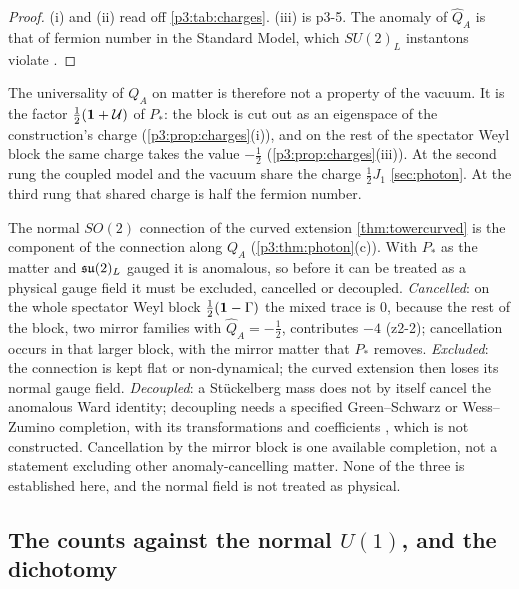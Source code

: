 \begin{proof}
(i) and (ii) read off \cref{p3:tab:charges}. (iii) is p3-5. The anomaly of $\hat Q_A$ is that of fermion number in the Standard Model, which $SU(2)_L$ instantons
violate \cite{tHooft76}.
\end{proof}

The universality of $Q_A$ on matter is therefore not a property of the vacuum. It is the factor $\tfrac12(\mathbf 1+\mathcal U)$ of $P_*$: the block is cut out as an eigenspace of
the construction's charge (\cref{p3:prop:charges}(i)), and on the rest of the spectator Weyl block the same charge takes the value $-\tfrac12$
(\cref{p3:prop:charges}(iii)). At the second rung the coupled model and the vacuum share the charge $\tfrac12J_1$ \cref{sec:photon}. At the third rung that
shared charge is half the fermion number.

\begin{remark}
\label{p3:rem:anomaly}
The normal $SO(2)$ connection of the curved extension \cref{thm:towercurved} is the component of the connection along $Q_A$ (\cref{p3:thm:photon}(c)).
With $P_*$ as the matter and $\mathfrak{su}(2)_L$ gauged it is anomalous, so before it can be treated as a physical gauge field it must be excluded, cancelled or
decoupled. \emph{Cancelled}: on the whole spectator Weyl block $\tfrac12(\mathbf 1-\Gamma)$ the mixed trace is $0$, because the rest of the block, two mirror
families with $\hat Q_A=-\tfrac12$, contributes $-4$ (z2-2); cancellation occurs in that larger block, with the mirror matter that $P_*$ removes. \emph{Excluded}: the
connection is kept flat or non-dynamical; the curved extension then loses its normal gauge field. \emph{Decoupled}: a St\"uckelberg mass does not by itself
cancel the anomalous Ward identity; decoupling needs a specified Green--Schwarz or Wess--Zumino completion, with its transformations and coefficients
\cite{Preskill91}, which is not constructed. Cancellation by the mirror block is one available completion, not a statement excluding other anomaly-cancelling
matter. None of the three is established here, and the normal field is not treated as physical.
\end{remark}

\subsection{The counts against the normal \texorpdfstring{$U(1)$}{U(1)}, and the dichotomy}
\label{p3:sec:counts}

